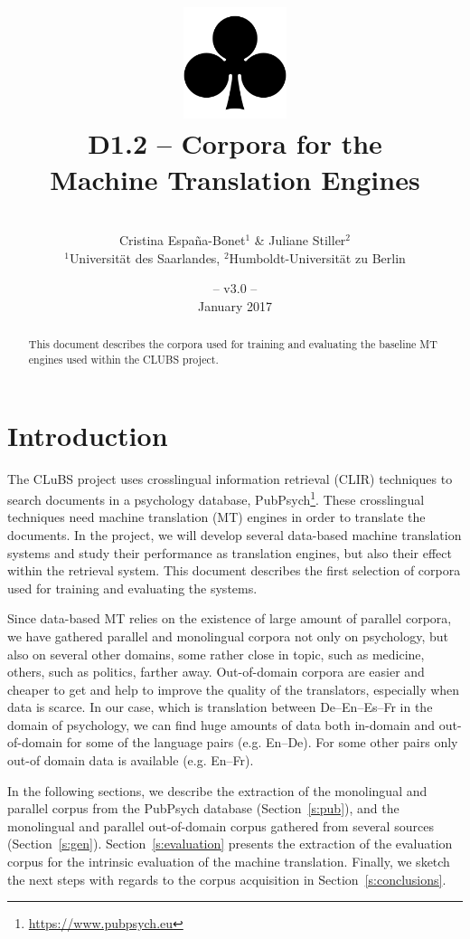 \documentclass[a4paper,11pt]{article}
\title{
\includegraphics[width=3cm]{./img/200px-SuitClubs.png} \\
\Huge D1.2 -- Corpora for the \\ Machine Translation Engines \\ 
}
\author{\vspace*{1cm}\\ \LARGE Cristina Espa\~na-Bonet$^1$ \& Juliane Stiller$^2$  \medskip \\ \Large $^1$Universit\"at des Saarlandes, $^2$Humboldt-Universit\"at zu Berlin}
\date{\vspace*{2cm} -- v3.0 --\\January 2017}
\begin{document}
\clearpage\maketitle
\thispagestyle{empty}

\vspace*{5cm}
\begin{abstract}
This document describes the corpora used for training and evaluating the baseline MT engines used within the CLUBS project.
\end{abstract}

\newpage
\tableofcontents
\clearpage


\section{Introduction}
\label{s:intro}

The CLuBS project uses crosslingual information retrieval (CLIR) techniques to search documents in a psychology database, PubPsych\footnote{\url{https://www.pubpsych.eu}}. These crosslingual techniques need machine translation (MT) engines in order to translate the documents. In the project, we will develop several data-based machine translation systems and study their performance as translation engines, but also their effect within the retrieval system. This document describes the first selection of corpora used for training and evaluating the systems.

Since data-based MT relies on the existence of large amount of parallel corpora, we have gathered parallel and monolingual corpora not only on psychology, but also on several other domains, some rather close in topic, such as medicine, others, such as politics, farther away. Out-of-domain corpora are easier and cheaper to get and help to improve the quality of the translators, especially when data is scarce. In our case, which is translation between De--En--Es--Fr in the domain of psychology, we can find huge amounts of data both in-domain and out-of-domain for some of the language pairs (e.g. En--De). For some other pairs only out-of domain data is available (e.g. En--Fr). 

In the following sections, we describe the extraction of the monolingual and parallel corpus from the PubPsych database (Section~\ref{s:pub}), and the monolingual and parallel out-of-domain corpus gathered from several sources (Section~\ref{s:gen}). 
Section~\ref{s:evaluation} presents the extraction of the evaluation corpus for the intrinsic evaluation of the machine translation. Finally, we sketch the next steps with regards to the corpus acquisition in Section~\ref{s:conclusions}.
\end{document}
